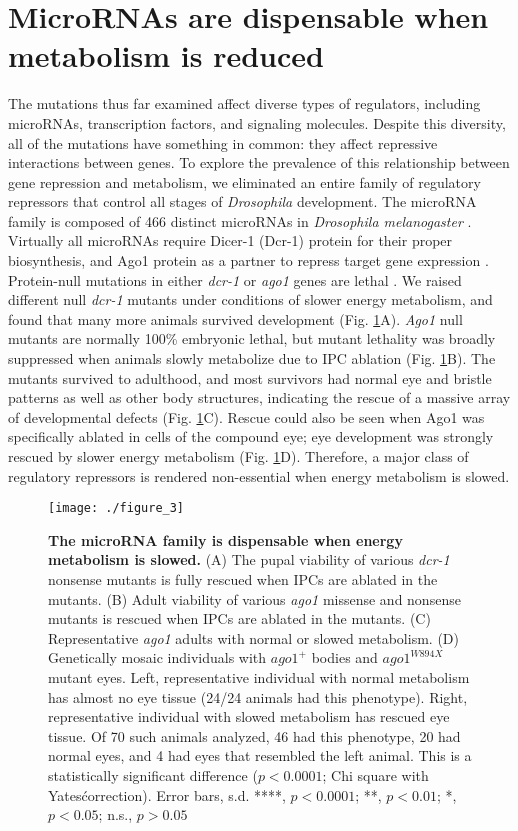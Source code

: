 \section{MicroRNAs are dispensable when metabolism is reduced}

The mutations thus far examined affect diverse types of regulators, including microRNAs, transcription factors, and signaling molecules. Despite this diversity, all of the mutations have something in common: they affect repressive interactions between genes. To explore the prevalence of this relationship between gene repression and metabolism, we eliminated an entire family of regulatory repressors that control all stages of \textit{Drosophila} development. The microRNA family is composed of 466 distinct microRNAs in \textit{Drosophila melanogaster} \cite{Kozomara2014}. Virtually all microRNAs require Dicer-1 (Dcr-1) protein for their proper biosynthesis, and Ago1 protein as a partner to repress target gene expression \cite{Carthew2009a}. Protein-null mutations in either \textit{dcr-1} or \textit{ago1} genes are lethal \cite{Pressman2012}. We raised different null \textit{dcr-1} mutants under conditions of slower energy metabolism, and found that many more animals survived development (Fig. \ref{fig:metabolism:fig3}A). \textit{Ago1} null mutants are normally 100\% embryonic lethal, but mutant lethality was broadly suppressed when animals slowly metabolize due to IPC ablation (Fig. \ref{fig:metabolism:fig3}B). The mutants survived to adulthood, and most survivors had normal eye and bristle patterns as well as other body structures, indicating the rescue of a massive array of developmental defects (Fig. \ref{fig:metabolism:fig3}C). Rescue could also be seen when Ago1 was specifically ablated in cells of the compound eye; eye development was strongly rescued by slower energy metabolism (Fig. \ref{fig:metabolism:fig3}D). Therefore, a major class of regulatory repressors is rendered non-essential when energy metabolism is slowed.

\begin{figure}[h!]
\centering
\texttt{[image: ./figure\_3]}
\caption[All microRNAs are dispensable when energy metabolism is slowed.]{\textbf{The microRNA family is dispensable when energy metabolism is slowed.} (A) The pupal viability of various \textit{dcr-1} nonsense mutants is fully rescued when IPCs are ablated in the mutants. (B) Adult viability of various \textit{ago1} missense and nonsense mutants is rescued when IPCs are ablated in the mutants. (C) Representative \textit{ago1} adults with normal or slowed metabolism. (D) Genetically mosaic individuals with $ago1^+$ bodies and $ago1^{W894X}$ mutant eyes. Left, representative individual with normal metabolism has almost no eye tissue (24/24 animals had this phenotype). Right, representative individual with slowed metabolism has rescued eye tissue. Of 70 such animals analyzed, 46 had this phenotype, 20 had normal eyes, and 4 had eyes that resembled the left animal. This is a statistically significant difference ($p<0.0001$; Chi square with Yates\' correction). Error bars, s.d. ****, $p<0.0001$; **, $p<0.01$; *, $p<0.05$; n.s., $p>0.05$}
\label{fig:metabolism:fig3}
\end{figure}

